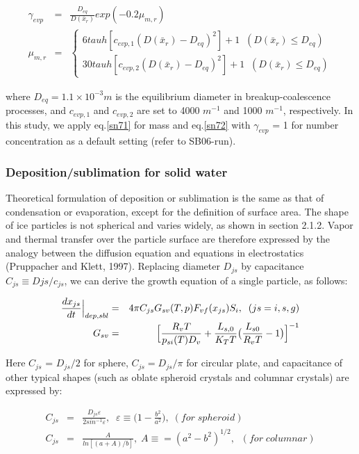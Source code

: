 \begin{eqnarray}
\gamma_{evp}&=&\frac{D_{eq}}{D(\bar{x}_{r})}exp(-0.2\mu_{m,r})\label{sn73}\\
\mu_{m,r}&=&
\left\{
\begin{array}{l}
6tauh[{c_{evp,1}(D(\bar{x}_{r})-D_{eq})}^{2}]+1\;\;(D(\bar{x}_{r})\leq D_{eq}) \\
30tauh[{c_{evp,2}(D(\bar{x}_{r})-D_{eq})}^{2}]+1\;\;(D(\bar{x}_{r})\leq D_{eq})
\label{sn74}
\end{array}
\right.
\end{eqnarray}

where $D_{eq} = 1.1 \times 10^{-3} m$ is the equilibrium diameter in breakup-coalescence processes, and $c_{evp,1}$ and $c_{evp,2}$ are set to 4000 $m^{-1}$ and 1000 $m^{-1}$, respectively. In this study, we apply eq.\ref{sn71} for mass and eq.\ref{sn72} with $\gamma_{evp}$ = 1 for number concentration as a default setting (refer to SB06-run).

\subsubsection{Deposition/sublimation for solid water}
Theoretical formulation of deposition or sublimation is the same as that of condensation or evaporation, except for the definition of surface area. The shape of ice particles is not spherical and varies widely, as shown in section 2.1.2. Vapor and thermal transfer over the particle surface are therefore expressed by the analogy between the diffusion equation and equations in electrostatics (Pruppacher and Klett, 1997). Replacing diameter $D_{js}$ by capacitance $C_{js}\equiv D{js}/c_{js}$, we can derive the growth equation of a single particle, as follows:

\begin{eqnarray}
\frac{dx_{js}}{dt}\Bigr|_{dep,sbl}&=&4\pi C_{js}G_{sv}(T,p)F_{vf}(x_{js})S_{i},\;\;(js=i,s,g)\label{sn75}\\
G_{sv}&=&\Bigl[\frac{R_{v}T}{p_{si}(T)D_{v}}+\frac{L_{s,0}}{K_{T}T}\bigl(\frac{L_{s0}}{R_{v}T}-1\bigr)\Bigr]^{-1}\label{sn76}
\end{eqnarray}

Here $C_{js}$ = $D_{js}/2$ for sphere, $C_{js} = D_{js}/\pi$ for circular plate, and capacitance of other typical shapes (such as oblate spheroid crystals and columnar crystals) are expressed by:

\begin{eqnarray}
C_{js}&=&\frac{D_{js}\varepsilon}{2sin^{-1}\varepsilon},\;\;\varepsilon\equiv\bigl(1-\frac{b^{2}}{a^{2}}\bigr), \;(for\;spheroid)\label{sn77}\\
C_{js}&=&\frac{A}{ln[(a+A)/b]},\;A\equiv=(a^{2}-b^{2})^{1/2},\;\;(for\;columnar)
\end{eqnarray}

